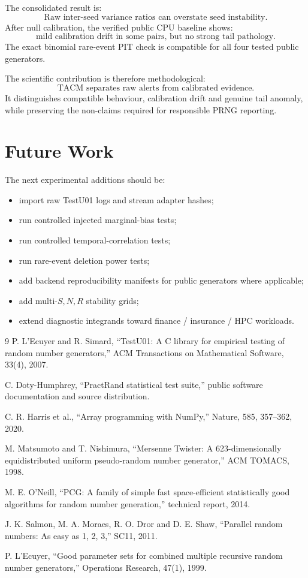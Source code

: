 \documentclass[11pt,a4paper]{article}
\begin{document}
The consolidated result is:
\[
\boxed{
\text{Raw inter-seed variance ratios can overstate seed instability.}
}
\]
After null calibration, the verified public CPU baseline shows:
\[
\boxed{
\text{mild calibration drift in some pairs, but no strong tail pathology.}
}
\]
The exact binomial rare-event PIT check is compatible for all four tested public generators.

The scientific contribution is therefore methodological:
\[
\boxed{
\text{TACM separates raw alerts from calibrated evidence.}
}
\]
It distinguishes compatible behaviour, calibration drift and genuine tail anomaly, while preserving the non-claims required for responsible PRNG reporting.

\section{Future Work}

The next experimental additions should be:
\begin{itemize}
  \item import raw TestU01 logs and stream adapter hashes;
  \item run controlled injected marginal-bias tests;
  \item run controlled temporal-correlation tests;
  \item run rare-event deletion power tests;
  \item add backend reproducibility manifests for public generators where applicable;
  \item add multi-$S,N,R$ stability grids;
  \item extend diagnostic integrands toward finance / insurance / HPC workloads.
\end{itemize}

\begin{thebibliography}{9}
P. L'Ecuyer and R. Simard, ``TestU01: A C library for empirical testing of random number generators,'' ACM Transactions on Mathematical Software, 33(4), 2007.

C. Doty-Humphrey, ``PractRand statistical test suite,'' public software documentation and source distribution.

C. R. Harris et al., ``Array programming with NumPy,'' Nature, 585, 357--362, 2020.

M. Matsumoto and T. Nishimura, ``Mersenne Twister: A 623-dimensionally equidistributed uniform pseudo-random number generator,'' ACM TOMACS, 1998.

M. E. O'Neill, ``PCG: A family of simple fast space-efficient statistically good algorithms for random number generation,'' technical report, 2014.

J. K. Salmon, M. A. Moraes, R. O. Dror and D. E. Shaw, ``Parallel random numbers: As easy as 1, 2, 3,'' SC11, 2011.

P. L'Ecuyer, ``Good parameter sets for combined multiple recursive random number generators,'' Operations Research, 47(1), 1999.
\end{thebibliography}
\end{document}
